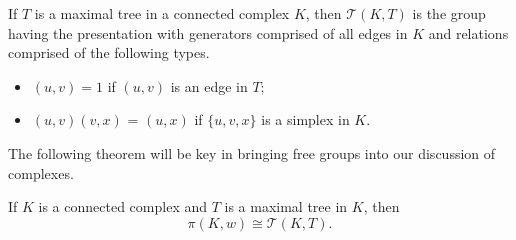 \begin{definition}
  If $T$ is a maximal tree in a connected complex $K$, then $\mathcal{T}(K,T)$ is the group having the presentation with generators comprised of all edges in $K$ and relations comprised of the following types.
  \begin{itemize}
  \item $(u,v) = 1$ if $(u,v)$ is an edge in $T$;
  \item $(u,v)(v,x)$ = $(u,x)$ if $\{u,v,x \}$ is a simplex in $K$.
  \end{itemize}
\end{definition}

The following theorem will be key in bringing free groups into our discussion of complexes.

\begin{theorem}[Tietze's]
  If $K$ is a connected complex and $T$ is a maximal tree in $K$, then
  \[
    \pi(K,w) \cong \mathcal{T}(K,T).
  \]
\end{theorem}

